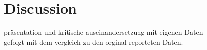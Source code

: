 \chapter{Discussion}
\color{ForestGreen}
präsentation und kritische auseinandersetzung mit eigenen Daten\\
gefolgt mit dem vergleich zu den orginal reporteten Daten.
\color{black}